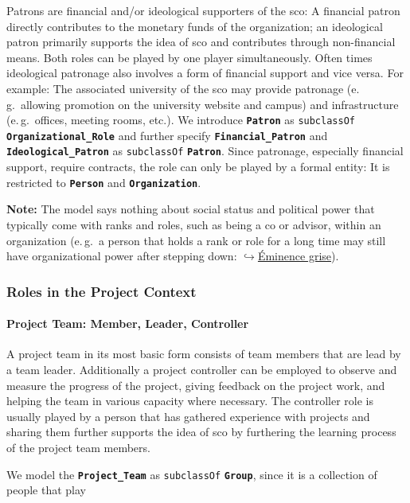 \documentclass[a4paper, DIV=13, BCOR=0cm]{scrbook}
\newcommand{\eg}{e.\,g.\ }
\newcommand{\class}[1]{\texttt{\textbf{#1}}}
\newcommand{\relation}[1]{\texttt{#1}}
\newcommand{\link}[2]{\href{#1}{$\hookrightarrow$#2}}
\begin{document}
Patrons are financial and/or ideological supporters of the \gls{sco}: A financial patron directly contributes to the monetary funds of the organization; an ideological patron primarily supports the idea of \gls{sco} and contributes through non-financial means. Both roles can be played by one player simultaneously. Often times ideological patronage also involves a form of financial support and vice versa. For example: The associated university of the \gls{sco} may provide patronage (\eg allowing promotion on the university website and campus) and infrastructure (\eg offices, meeting rooms, etc.). We introduce \class{Patron} as \relation{subclassOf} \class{Organizational\_Role} and further specify \class{Financial\_Patron} and \class{Ideological\_Patron} as \relation{subclassOf} \class{Patron}. Since patronage, especially financial support, require contracts, the role can only be played by a formal entity: It is restricted to \class{Person} and \class{Organization}.

\begin{mdframed}
	\textbf{Note:} The model says nothing about social status and political power that typically come with ranks and roles, such as being a \gls{co} or advisor, within an organization (\eg a person that holds a rank or role for a long time may still have organizational power after stepping down: \link{https://en.wikipedia.org/wiki/Éminence_grise}{Éminence grise}).
\end{mdframed}

\subsubsection{Roles in the Project Context}
\paragraph{Project Team: Member, Leader, Controller}
A project team in its most basic form consists of team members that are lead by a team leader. Additionally a project controller can be employed to observe and measure the progress of the project, giving feedback on the project work, and helping the team in various capacity where necessary. The controller role is usually played by a person that has gathered experience with projects and sharing them further supports the idea of \gls{sco} by furthering the learning process of the project team members.

We model the \class{Project\_Team} as \relation{subclassOf} \class{Group}, since it is a collection of people that play
\end{document}
